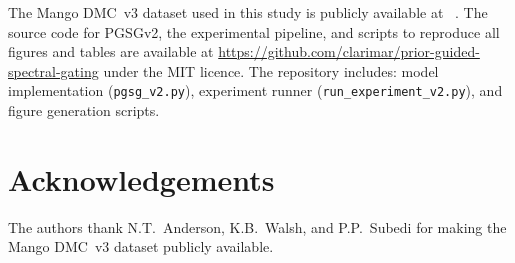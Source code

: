\documentclass[preprint,12pt,hidelinks]{elsarticle}
\begin{document}
The Mango DMC~v3 dataset used in this study is publicly available at ~\cite{anderson2021}. The source code for PGSGv2, the experimental pipeline, and scripts to reproduce all figures and tables are available at \url{https://github.com/clarimar/prior-guided-spectral-gating} under the MIT licence. The repository includes: model implementation (\texttt{pgsg\_v2.py}), experiment runner (\texttt{run\_experiment\_v2.py}), and figure generation scripts.

\section*{Acknowledgements}

The authors thank N.T.\ Anderson, K.B.\ Walsh, and P.P.\ Subedi
for making the Mango DMC~v3 dataset publicly available.




\end{document}
